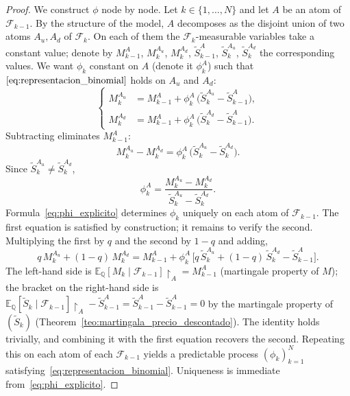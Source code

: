 \documentclass[11pt,a4paper,oneside]{report}
\theoremstyle{plain}
\theoremstyle{definition}
\theoremstyle{remark}
\newcommand{\E}{\mathbb{E}}
\newcommand{\Q}{\mathbb{Q}}
\newcommand{\F}{\mathcal{F}}
\newcommand{\1}{\mathbf{1}}
\begin{document}
\begin{proof}
We construct $\phi$ node by node. Let $k \in \{1, \ldots, N\}$ and let
$A$ be an atom of $\F_{k-1}$. By the structure of the model, $A$
decomposes as the disjoint union of two atoms $A_u, A_d$ of $\F_k$. On
each of them the $\F_k$-measurable variables take a constant value;
denote by $M_{k-1}^A$, $M_k^{A_u}$, $M_k^{A_d}$,
$\widetilde S_{k-1}^A$, $\widetilde S_k^{A_u}$, $\widetilde S_k^{A_d}$
the corresponding values. We want $\phi_k$ constant on $A$ (denote it
$\phi_k^A$) such that $\eqref{eq:representacion_binomial}$ holds on
$A_u$ and $A_d$:
\begin{equation*}
\left\{
\begin{aligned}
  M_k^{A_u} &= M_{k-1}^A + \phi_k^A\,
              \bigl(\widetilde S_k^{A_u} - \widetilde S_{k-1}^A\bigr), \\
  M_k^{A_d} &= M_{k-1}^A + \phi_k^A\,
              \bigl(\widetilde S_k^{A_d} - \widetilde S_{k-1}^A\bigr).
\end{aligned}
\right.
\end{equation*}
Subtracting eliminates $M_{k-1}^A$:
\begin{equation*}
  M_k^{A_u} - M_k^{A_d}
  = \phi_k^A\, \bigl(\widetilde S_k^{A_u} - \widetilde S_k^{A_d}\bigr).
\end{equation*}
Since $\widetilde S_k^{A_u} \neq \widetilde S_k^{A_d}$,
\begin{equation}\label{eq:phi_explicito}
  \phi_k^A = \frac{M_k^{A_u} - M_k^{A_d}}{\widetilde S_k^{A_u}
                                          - \widetilde S_k^{A_d}}.
\end{equation}
Formula~\eqref{eq:phi_explicito} determines $\phi_k$ uniquely on each
atom of $\F_{k-1}$. The first equation is satisfied by construction;
it remains to verify the second. Multiplying the first by $q$ and the
second by $1 - q$ and adding,
\begin{equation*}
  q\, M_k^{A_u} + (1-q)\, M_k^{A_d}
  = M_{k-1}^A + \phi_k^A\,
    \bigl[q\, \widetilde S_k^{A_u} + (1-q)\, \widetilde S_k^{A_d}
          - \widetilde S_{k-1}^A\bigr].
\end{equation*}
The left-hand side is
$\E_\Q[M_k \mid \F_{k-1}]\restriction_A = M_{k-1}^A$ (martingale
property of $M$); the bracket on the right-hand side is
$\E_\Q[\widetilde S_k \mid \F_{k-1}]\restriction_A - \widetilde S_{k-1}^A
= \widetilde S_{k-1}^A - \widetilde S_{k-1}^A = 0$ by the martingale
property of $(\widetilde S_k)$
(Theorem~\ref{teo:martingala_precio_descontado}). The identity holds
trivially, and combining it with the first equation recovers the
second. Repeating this on each atom of each $\F_{k-1}$ yields a
predictable process $(\phi_k)_{k=1}^N$
satisfying~\eqref{eq:representacion_binomial}. Uniqueness is immediate
from~\eqref{eq:phi_explicito}.
\end{proof}
\end{document}
